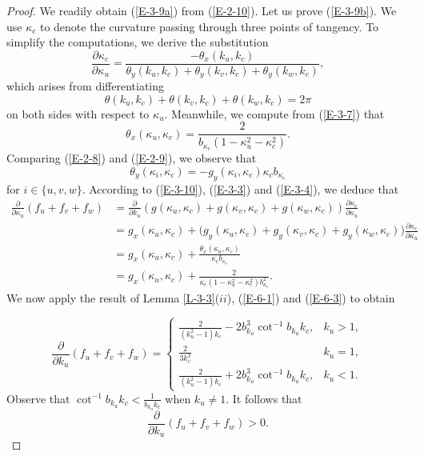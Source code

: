 \documentclass[10pt,a4paper]{amsart}
\begin{document}
\begin{proof}
We readily obtain (\ref{E-3-9a}) from (\ref{E-2-10}). Let us prove (\ref{E-3-9b}).
We use $\kappa_c$ to denote the curvature passing through three points of tangency.
To simplify the computations, we derive the substitution
\begin{equation}\label{E-3-10}
\frac{\partial \kappa_c}{\partial \kappa_u}=\frac{-\theta_x(k_u,k_c)}{\theta_y(k_u,k_c)+\theta_y(k_v,k_c)+\theta_y(k_w,k_c)},
\end{equation}
which arises from differentiating
 \[\theta(k_u,k_c)+\theta(k_v,k_c)+\theta(k_w,k_c)=2\pi\]
on both sides with respect to $\kappa_u$. Meanwhile, we compute from (\ref{E-3-7}) that
\begin{equation}\label{E-3-3}\theta_x(\kappa_u,\kappa_c)=\frac{2}{b_{\kappa_c}(1-\kappa_u^2-\kappa_c^2)}.\end{equation}
Comparing (\ref{E-2-8}) and (\ref{E-2-9}), we observe that
\begin{equation}\label{E-3-4}\theta_y(\kappa_i,\kappa_c)=-g_y(\kappa_i,\kappa_c)\kappa_cb_{\kappa_c}\end{equation}
for $i\in\{u,v,w\}$. According to (\ref{E-3-10}), (\ref{E-3-3}) and (\ref{E-3-4}), we deduce that
 \[\begin{aligned}
 \frac{\partial}{\partial \kappa_u}(f_u+f_v+f_w)&=\frac{\partial}{\partial k_u}(g(\kappa_u,\kappa_c)+g(\kappa_v,\kappa_c)+g(\kappa_w,\kappa_c))\frac{\partial \kappa_c}{\partial \kappa_u}\\
 &=g_x(\kappa_u,\kappa_c)+\big(g_y(\kappa_u,\kappa_c)+g_y(\kappa_v,\kappa_c)+g_y(\kappa_w,\kappa_c)\big)\frac{\partial \kappa_c}{\partial \kappa_u}\\
 &=g_x(\kappa_u,\kappa_c)+\frac{\theta_x(\kappa_u,\kappa_c)}{\kappa_cb_{\kappa_c}}\\
&=g_x(\kappa_u,\kappa_c)+\frac{2}{\kappa_c(1 - \kappa_u^2 - \kappa_c^2)b^2_{\kappa_c}}.
 \end{aligned}\]
We now apply the result of  Lemma \ref{L-3-3}($ii$), (\ref{E-6-1}) and (\ref{E-6-3}) to obtain



  \[
\frac{\partial}{\partial k_u}(f_u+f_v+f_w)
=
\begin{cases}
\frac{2}{(k_u^2-1)k_c}-2b^3_{k_u}\cot^{-1}b_{k_u}k_c,
& k_u>1,\\
\frac{2}{3k_c^3}
& k_u=1,\\
\frac{2}{(k_u^2-1)k_c}+2b^3_{k_u}\cot^{-1}b_{k_u}k_c,
& k_u<1.
\end{cases}
\]
Observe that $\cot^{-1}b_{k_u}k_c<\frac{1}{b_{k_u}k_c}$ when $k_u\neq 1$. It follows that
\[\frac{\partial}{\partial k_u}(f_u+f_v+f_w)>0.\]
\end{proof}
\end{document}
